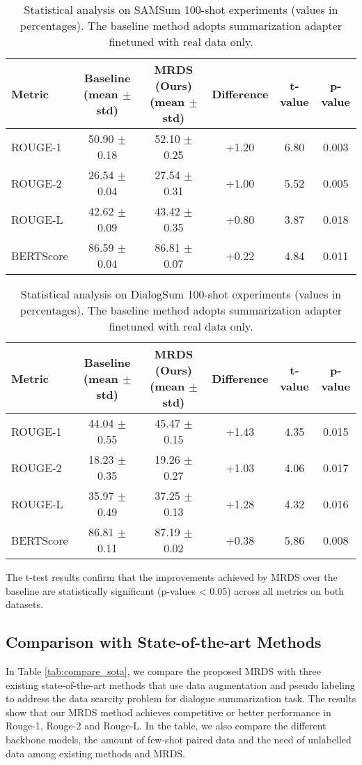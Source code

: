 \begin{table*}[htbp]
\centering
\caption{Statistical analysis on SAMSum 100-shot experiments (values in percentages). The baseline method adopts summarization adapter finetuned with real data only.}
\label{tab:stat_samsum}
\begin{tabular}{lccccc}
\toprule
\textbf{Metric} & \textbf{Baseline} (mean $\pm$ std) & \textbf{MRDS (Ours)} (mean $\pm$ std) & \textbf{Difference} & \textbf{t-value} & \textbf{p-value} \\
\midrule
ROUGE-1    & 50.90 $\pm$ 0.18   & 52.10 $\pm$ 0.25   & +1.20    & 6.80 & 0.003 \\
ROUGE-2    & 26.54 $\pm$ 0.04   & 27.54 $\pm$ 0.31   & +1.00    & 5.52 & 0.005 \\
ROUGE-L    & 42.62 $\pm$ 0.09   & 43.42 $\pm$ 0.35   & +0.80    & 3.87 & 0.018 \\
BERTScore  & 86.59 $\pm$ 0.04   & 86.81 $\pm$ 0.07   & +0.22    & 4.84 & 0.011 \\
\bottomrule
\end{tabular}
\end{table*}

\begin{table*}[htbp]
\centering
\caption{Statistical analysis on DialogSum 100-shot experiments (values in percentages). The baseline method adopts summarization adapter finetuned with real data only.}
\label{tab:stat_dialogsum}
\begin{tabular}{lccccc}
\toprule
\textbf{Metric} & \textbf{Baseline} (mean $\pm$ std) & \textbf{MRDS (Ours)} (mean $\pm$ std) & \textbf{Difference} & \textbf{t-value} & \textbf{p-value} \\
\midrule
ROUGE-1    & 44.04 $\pm$ 0.55   & 45.47 $\pm$ 0.15   & +1.43    & 4.35 & 0.015 \\
ROUGE-2    & 18.23 $\pm$ 0.35   & 19.26 $\pm$ 0.27   & +1.03    & 4.06 & 0.017 \\
ROUGE-L    & 35.97 $\pm$ 0.49   & 37.25 $\pm$ 0.13   & +1.28    & 4.32 & 0.016 \\
BERTScore  & 86.81 $\pm$ 0.11   & 87.19 $\pm$ 0.02   & +0.38    & 5.86 & 0.008 \\
\bottomrule
\end{tabular}
\end{table*}

The t-test results confirm that the improvements achieved by MRDS over the baseline are statistically significant (p-values < 0.05) across all metrics on both datasets.


\subsection{Comparison with State-of-the-art Methods}
In Table \ref{tab:compare_sota}, we compare the proposed MRDS with three existing state-of-the-art methods that use data augmentation and pseudo labeling to address the data scarcity problem for dialogue summarization task.
The results show that our MRDS method achieves competitive or better performance in Rouge-1, Rouge-2 and Rouge-L.
In the table, we also compare the different backbone models, the amount of few-shot paired data and the need of unlabelled data among existing methods and MRDS.

